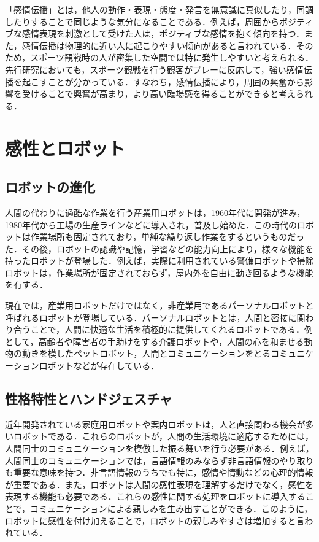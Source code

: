 「感情伝播」とは，他人の動作・表現・態度・発言を無意識に真似したり，同調したりすることで同じような気分になることである\cite{denpa}．例えば，周囲からポジティブな感情表現を刺激として受けた人は，ポジティブな感情を抱く傾向を持つ．また，感情伝播は物理的に近い人に起こりやすい傾向があると言われている．そのため，スポーツ観戦時の人が密集した空間では特に発生しやすいと考えられる．先行研究においても，スポーツ観戦を行う観客がプレーに反応して，強い感情伝播を起こすことが分かっている\cite{jyodo}．すなわち，感情伝播により，周囲の興奮から影響を受けることで興奮が高まり，より高い臨場感を得ることができると考えられる．

\newpage

\section{感性とロボット}
\label{sec2.3}

\subsection{ロボットの進化}
\label{sec2.3.1}

人間の代わりに過酷な作業を行う産業用ロボットは，1960年代に開発が進み，1980年代から工場の生産ラインなどに導入され，普及し始めた．この時代のロボットは作業場所も固定されており，単純な繰り返し作業をするというものだった．その後，ロボットの認識や記憶，学習などの能力向上により，様々な機能を持ったロボットが登場した．例えば，実際に利用されている警備ロボットや掃除ロボットは，作業場所が固定されておらず，屋内外を自由に動き回るような機能を有する．

現在では，産業用ロボットだけではなく，非産業用であるパーソナルロボットと呼ばれるロボットが登場している．パーソナルロボットとは，人間と密接に関わり合うことで，人間に快適な生活を積極的に提供してくれるロボットである\cite{perso}．例として，高齢者や障害者の手助けをする介護ロボットや，人間の心を和ませる動物の動きを模したペットロボット，人間とコミュニケーションをとるコミュニケーションロボットなどが存在している．




\subsection{性格特性とハンドジェスチャ}
\label{sec2.3.2}

近年開発されている家庭用ロボットや案内ロボットは，人と直接関わる機会が多いロボットである．これらのロボットが，人間の生活環境に適応するためには，人間同士のコミュニケーションを模倣した振る舞いを行う必要がある．例えば，人間同士のコミュニケーションでは，言語情報のみならず非言語情報のやり取りも重要な意味を持つ\cite{gengo}．非言語情報のうちでも特に，感情や情動などの心理的情報が重要である．また，ロボットは人間の感性表現を理解するだけでなく，感性を表現する機能も必要である．これらの感性に関する処理をロボットに導入することで，コミュニケーションによる親しみを生み出すことができる．このように，ロボットに感性を付け加えることで，ロボットの親しみやすさは増加すると言われている．

